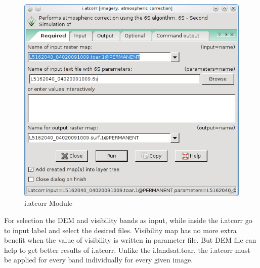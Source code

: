 \begin{figure}[htbp]
   \centering
   \includegraphics[scale=0.4]{gipe016.png}
   \caption{i.atcorr Module}
   \label{fig:gipe016}
\end{figure}

For selection the DEM and visibility bands as input, while inside the i.atcorr go to input label and select the desired files. Visibility map has no more extra benefit when the value of visibility is written in parameter file. But DEM file can help to get better results of i.atcorr.\newline
Unlike the i.landsat.toar, the i.atcorr must be applied for every band individually for every given image.\newline


